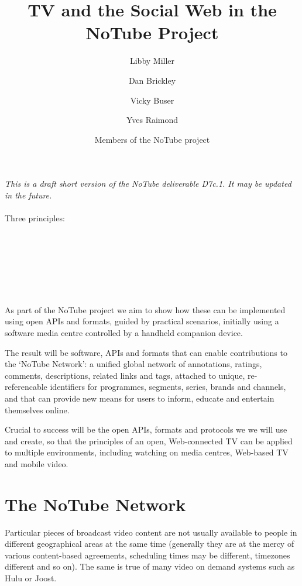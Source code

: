 \documentclass[]{article}%
\title{TV and the Social Web in the NoTube Project}
\author[1]{Libby Miller}
\author[2]{Dan Brickley}
\author[1]{Vicky Buser}
\author[1]{Yves Raimond}
\author[3]{Members of the NoTube project}
\affil[1]{BBC, UK}
\affil[2]{Vrije Universiteit, Amsterdam}
\affil[3]{http://notube.tv}
\begin{document}
\ifpdf
{}
\else
{}
\fi

\maketitle%
\emph{This is a draft short version of the NoTube deliverable D7c.1. It may be updated in the future.}
\\
\\
Three principles:
\\
\\
\\
\\
\\
\\
\\
\\
As part of the NoTube project we aim to show how these can be implemented using open APIs and formats, guided by practical scenarios, initially using a software media centre controlled by a handheld companion device. 

The result will be software, APIs and formats that can enable contributions to the `NoTube Network': a unified global network of annotations, ratings, comments, descriptions, related links and tags, attached to unique, re-referencable identifiers for programmes, segments, series, brands and channels, and that can provide new means for users to inform, educate and entertain themselves online. 

Crucial to success will be the open APIs, formats and protocols we we will use and create, so that the principles of an open, Web-connected TV can be applied to multiple environments, including watching on media centres, Web-based TV and mobile video.

\section{The NoTube Network}

Particular pieces of broadcast video content are not usually available to people in different geographical areas at the same time (generally they are at the mercy of various content-based agreements, scheduling times may be different, timezones different and so on). The same is true of many video on demand systems such as Hulu or Joost. 
\end{document}
